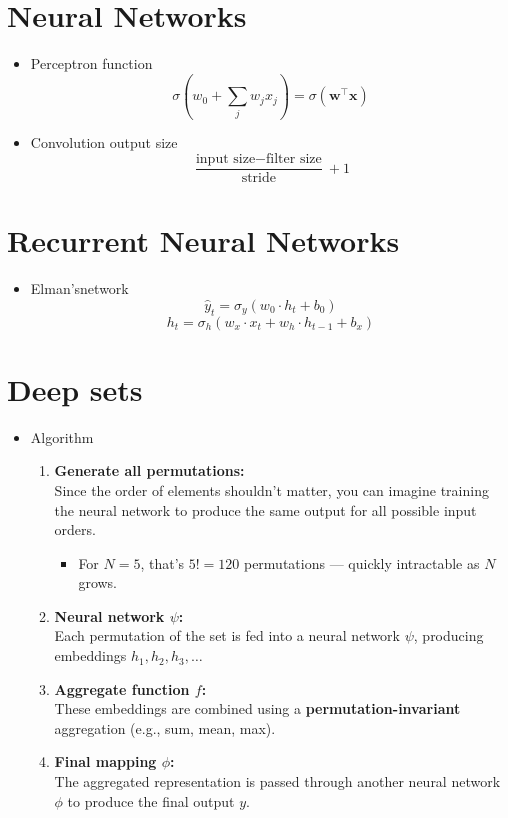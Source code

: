 \documentclass[11pt]{article}
\begin{document}
\section{Neural Networks}
\begin{itemize}
	\item Perceptron function
	      \[
		      \sigma\!\left(w_0 + \sum_j w_j x_j\right) = \sigma(\mathbf{w}^\top \mathbf{x})
	      \]
\item Convolution output size
\[
\frac{\text{input size} - \text{filter size}}{\text{stride}} + 1
\]
\end{itemize}
\section{Recurrent Neural Networks}
\begin{itemize}
	\item Elman'snetwork
	      \[
		      \hat{y}_t = \sigma_y(w_0 \cdot h_t + b_0)
	      \]
	      \[
		      h_t = \sigma_h(w_x \cdot x_t + w_h \cdot h_{t-1} + b_x)
	      \]
\end{itemize}
\section{Deep sets}
\begin{itemize}
	\item Algorithm
	      \begin{enumerate}
		      \item \textbf{Generate all permutations:} \\
		            Since the order of elements shouldn’t matter, you can imagine training the neural network to produce the same output for all possible input orders.
		            \begin{itemize}
			            \item For \( N = 5 \), that’s \( 5! = 120 \) permutations — quickly intractable as \( N \) grows.
		            \end{itemize}

		      \item \textbf{Neural network \(\psi\):} \\
		            Each permutation of the set is fed into a neural network \(\psi\), producing embeddings \( h_1, h_2, h_3, \ldots \)

		      \item \textbf{Aggregate function \(f\):} \\
		            These embeddings are combined using a \textbf{permutation-invariant} aggregation (e.g., sum, mean, max).

		      \item \textbf{Final mapping \(\phi\):} \\
		            The aggregated representation is passed through another neural network \(\phi\) to produce the final output \( y \).
	      \end{enumerate}
\end{itemize}
\end{document}
